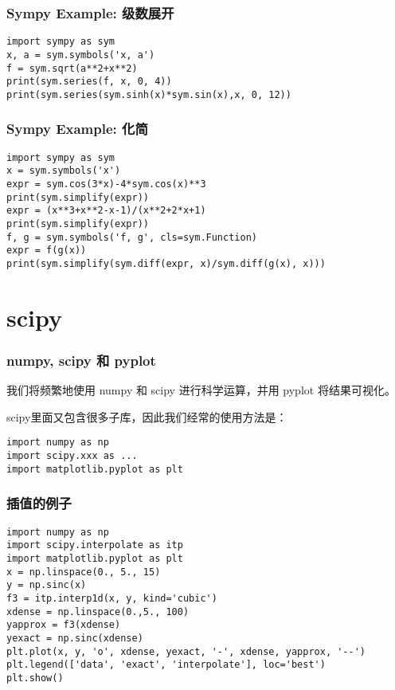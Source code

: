 \documentclass[CJK,13pt]{beamer}
\begin{document}
\begin{frame}[fragile]
  \frametitle{Sympy Example: 级数展开}
\begin{verbatim} 
import sympy as sym
x, a = sym.symbols('x, a')
f = sym.sqrt(a**2+x**2)
print(sym.series(f, x, 0, 4))
print(sym.series(sym.sinh(x)*sym.sin(x),x, 0, 12))
\end{verbatim}
\ecode
\end{frame}

\begin{frame}[fragile]
  \frametitle{Sympy Example: 化简}
\begin{verbatim}
import sympy as sym
x = sym.symbols('x')
expr = sym.cos(3*x)-4*sym.cos(x)**3
print(sym.simplify(expr))
expr = (x**3+x**2-x-1)/(x**2+2*x+1)
print(sym.simplify(expr))
f, g = sym.symbols('f, g', cls=sym.Function)
expr = f(g(x))
print(sym.simplify(sym.diff(expr, x)/sym.diff(g(x), x))) 
\end{verbatim}
\ecode
\end{frame}


\section{scipy}


\begin{frame}[fragile]
  \frametitle{numpy, scipy 和 pyplot}
  我们将频繁地使用 numpy 和 scipy 进行科学运算，并用 pyplot 将结果可视化。

  scipy里面又包含很多子库，因此我们经常的使用方法是：
  \bcode{}
\begin{verbatim}
import numpy as np
import scipy.xxx as ...
import matplotlib.pyplot as plt
\end{verbatim}        
\ecode

\end{frame}


\begin{frame}[fragile]
  \frametitle{插值的例子}
\begin{verbatim}
import numpy as np
import scipy.interpolate as itp
import matplotlib.pyplot as plt
x = np.linspace(0., 5., 15)
y = np.sinc(x)
f3 = itp.interp1d(x, y, kind='cubic')
xdense = np.linspace(0.,5., 100)
yapprox = f3(xdense)
yexact = np.sinc(xdense)
plt.plot(x, y, 'o', xdense, yexact, '-', xdense, yapprox, '--')
plt.legend(['data', 'exact', 'interpolate'], loc='best')
plt.show()
\end{verbatim}        
\ecode
\end{frame}
\end{document}
